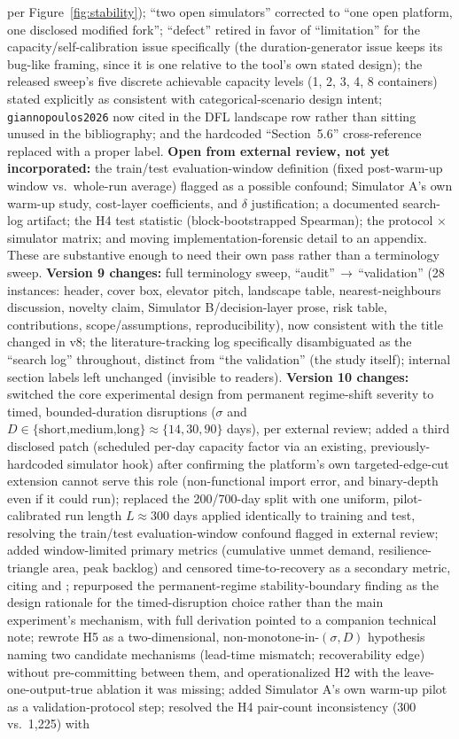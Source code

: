 \documentclass[12pt,a4paper]{article}
\begin{document}
per Figure~\ref{fig:stability}); ``two open simulators'' corrected to ``one open platform, one disclosed modified fork''; ``defect'' retired in favor of ``limitation'' for the capacity/self-calibration issue specifically (the duration-generator issue keeps its bug-like framing, since it is one relative to the tool's own stated design); the released sweep's five discrete achievable capacity levels (1, 2, 3, 4, 8 containers) stated explicitly as consistent with categorical-scenario design intent; \texttt{giannopoulos2026} now cited in the DFL landscape row rather than sitting unused in the bibliography; and the hardcoded ``Section~5.6'' cross-reference replaced with a proper label. \textbf{Open from external review, not yet incorporated:} the train/test evaluation-window definition (fixed post-warm-up window vs.\ whole-run average) flagged as a possible confound; Simulator A's own warm-up study, cost-layer coefficients, and $\delta$ justification; a documented search-log artifact; the H4 test statistic (block-bootstrapped Spearman); the protocol$\,\times\,$simulator matrix; and moving implementation-forensic detail to an appendix. These are substantive enough to need their own pass rather than a terminology sweep. \textbf{Version 9 changes:} full terminology sweep, ``audit''$\,\to\,$``validation'' (28 instances: header, cover box, elevator pitch, landscape table, nearest-neighbours discussion, novelty claim, Simulator B/decision-layer prose, risk table, contributions, scope/assumptions, reproducibility), now consistent with the title changed in v8; the literature-tracking log specifically disambiguated as the ``search log'' throughout, distinct from ``the validation'' (the study itself); internal section labels left unchanged (invisible to readers). \textbf{Version 10 changes:} switched the core experimental design from permanent regime-shift severity to timed, bounded-duration disruptions ($\sigma$ and $D\in\{\text{short,medium,long}\}\approx\{14,30,90\}$ days), per external review; added a third disclosed patch (scheduled per-day capacity factor via an existing, previously-hardcoded simulator hook) after confirming the platform's own targeted-edge-cut extension cannot serve this role (non-functional import error, and binary-depth even if it could run); replaced the 200/700-day split with one uniform, pilot-calibrated run length $L\approx300$ days applied identically to training and test, resolving the train/test evaluation-window confound flagged in external review; added window-limited primary metrics (cumulative unmet demand, resilience-triangle area, peak backlog) and censored time-to-recovery as a secondary metric, citing \citet{bruneau2003} and \citet{henry2012}; repurposed the permanent-regime stability-boundary finding as the design rationale for the timed-disruption choice rather than the main experiment's mechanism, with full derivation pointed to a companion technical note; rewrote H5 as a two-dimensional, non-monotone-in-$(\sigma,D)$ hypothesis naming two candidate mechanisms (lead-time mismatch; recoverability edge) without pre-committing between them, and operationalized H2 with the leave-one-output-true ablation it was missing; added Simulator A's own warm-up pilot as a validation-protocol step; resolved the H4 pair-count inconsistency (300 vs.\ 1{,}225) with 
\end{document}
